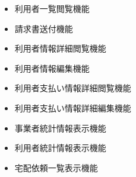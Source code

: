 \documentclass[a4paper, titlepage]{jsarticle}
\begin{document}
\begin{itemize}[labelwidth=\linewidth]
  \item 利用者一覧閲覧機能 %
  \item 請求書送付機能 %
  \item 利用者情報詳細閲覧機能 %
  \item 利用者情報編集機能 %
  \item 利用者支払い情報詳細閲覧機能 %
  \item 利用者支払い情報詳細編集機能 %
  
  \item 事業者統計情報表示機能 %
  
  \item 利用者統計情報表示機能 %
  
  \item 宅配依頼一覧表示機能 %
  

\end{itemize}
\end{document}
